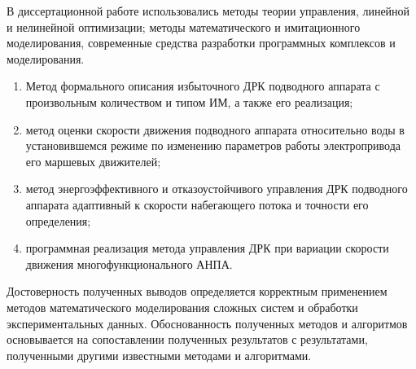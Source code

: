 {\methods} В диссертационной работе использовались методы теории управления, линейной и нелинейной оптимизации; методы математического и имитационного моделирования, современные средства разработки программных комплексов и моделирования.

{}
\begin{enumerate}[beginpenalty=10000] %
  \item Метод формального описания избыточного ДРК подводного аппарата с произвольным количеством и типом ИМ, а также его реализация;
  \item метод оценки скорости движения подводного аппарата относительно воды в установившемся режиме по изменению параметров работы электропривода его маршевых движителей;
  \item метод энергоэффективного и отказоустойчивого управления ДРК подводного аппарата адаптивный к скорости набегающего потока и точности его определения;
  \item программная реализация метода управления ДРК при вариации скорости движения многофункционального АНПА.
\end{enumerate}

{\reliability} Достоверность полученных выводов определяется корректным применением методов математического моделирования сложных систем и обработки экспериментальных данных. Обоснованность полученных методов и алгоритмов основывается на сопоставлении полученных результатов с результатами, полученными другими известными методами и алгоритмами.

